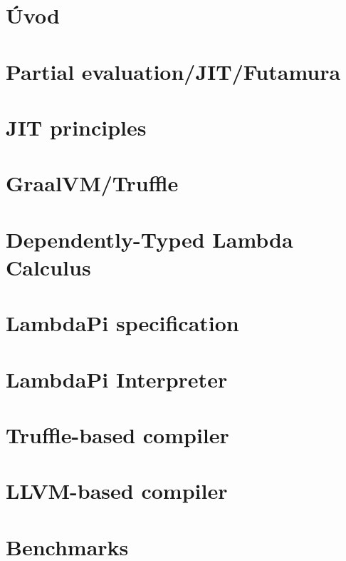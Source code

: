 \documentclass[english,zadani,odsaz]{fitthesis}
\date{\today}
\title{}
\begin{document}
\maketitle
\setlength{\parskip}{0pt}
{\hypersetup{hidelinks}\tableofcontents}
\iftotalfigures\listoffigures\fi
\iftotaltables\listoftables\fi
\iftotallistings\listoflistings\fi
\iftwoside\cleardoublepage\fi
\setlength{\parskip}{0.5\bigskipamount}

\chapter{Úvod}
\label{sec:org287e116}
\chapter{Partial evaluation/JIT/Futamura}
\label{sec:org64cac04}
\chapter{JIT principles}
\label{sec:org49af6be}
\chapter{GraalVM/Truffle}
\label{sec:org65567bb}
\chapter{Dependently-Typed Lambda Calculus}
\label{sec:org378c19a}
\chapter{LambdaPi specification}
\label{sec:org7182857}
\chapter{LambdaPi Interpreter}
\label{sec:org9c2ae1f}
\chapter{Truffle-based compiler}
\label{sec:org0e9198f}
\chapter{LLVM-based compiler}
\label{sec:orgbdb622a}
\chapter{Benchmarks}
\label{sec:org5386c90}
\end{document}
